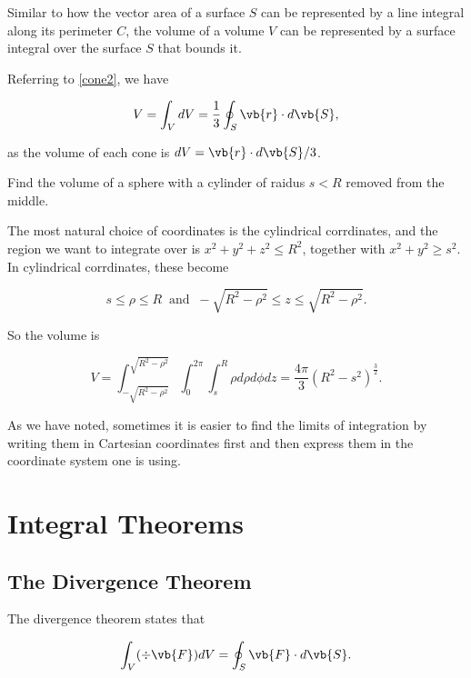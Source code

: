 \documentclass[english,a4paper,12pt]{report}
\begin{document}
Similar to how the vector area of a surface \(S\) can be represented by a line integral along its perimeter \(C\), the volume of a volume \(V\)  can be represented by a surface integral over the surface \(S\) that bounds it.

Referring to \cref{cone2}, we have

\begin{equation}
	V = \int_{V}^{} dV = \frac{1}{3} \oint_{S} \vb{r} \cdot d\vb{S}, 
\end{equation}

as the volume of each cone is \(dV =  \vb{r} \cdot d\vb{S} /3 \). 


{Find the volume of a sphere with a cylinder of raidus \(s < R\) removed from the middle. }
{The most natural choice of coordinates is the cylindrical corrdinates, and the region we want to integrate over is \(x^2+y^2+z^2 \le R^2\), together with \(x^2+y^2 \ge s ^2\). In cylindrical corrdinates, these become 

\begin{equation}
	s \le \rho \le R ~\text { and }~ -\sqrt{R^2-\rho ^2} \le z \le \sqrt{R^2-\rho ^2}. 
\end{equation}

So the volume is

\begin{equation}
	V = \int_{-\sqrt{R^2-\rho ^2} }^{\sqrt{R^2-\rho ^2} } \int_{0}^{2\pi } \int_{s}^{R} \rho d\rho d \phi dz = \frac{4\pi }{3} (R^2-s ^2)^{\frac{3}{2} }.       
\end{equation}

As we have noted, sometimes it is easier to find the limits of integration by writing them in Cartesian coordinates first and then express them in the coordinate system one is using.
} 


\section{Integral Theorems}

\subsection{The Divergence Theorem}
The divergence theorem states that

\begin{equation} \label{divthmm} 
	\int _{V}(\div{\vb{F} } )dV = \oint_{S} \vb{F} \cdot d\vb{S} .
\end{equation}
\end{document}
